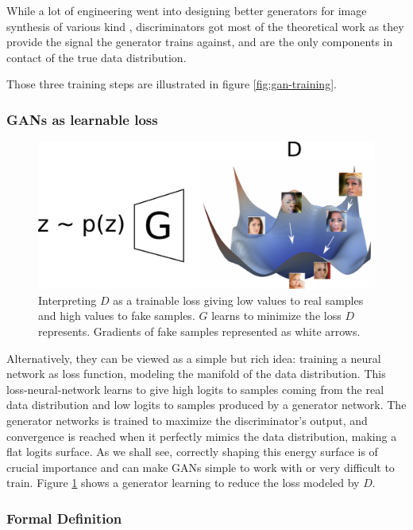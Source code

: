 While a lot of engineering went into designing better generators for image synthesis of various kind \cite{progan,stylegan,stylegan2,msggan}, discriminators got most of the theoretical work as they provide the signal the generator trains against, and are the only components in contact of the true data distribution.

Those three training steps are illustrated in figure \ref{fig:gan-training}.

\subsubsection{\acp{GAN} as learnable loss}

\begin{figure}[ht]
    \centering
    \includegraphics[scale=0.5]{60-files/gan-as-loss.pdf}
    \caption{Interpreting $D$ as a trainable loss giving low values to real samples and high values to fake samples. $G$ learns to minimize the loss $D$ represents. Gradients of fake samples represented as white arrows.}
    \label{fig:gan-training-energy}
\end{figure}

Alternatively, they can be viewed as a simple but rich idea: training a neural network as loss function, modeling the manifold of the data distribution. This loss-neural-network learns to give high logits to samples coming from the real data distribution and low logits to samples produced by a generator network. The generator networks is trained to maximize the discriminator's output, and convergence is reached when it perfectly mimics the data distribution, making a flat logits surface. As we shall see, correctly shaping this energy surface is of crucial importance and can make GANs simple to work with or very difficult to train. Figure \ref{fig:gan-training-energy} shows a generator learning to reduce the loss modeled by $D$.

\subsubsection{Formal Definition}

